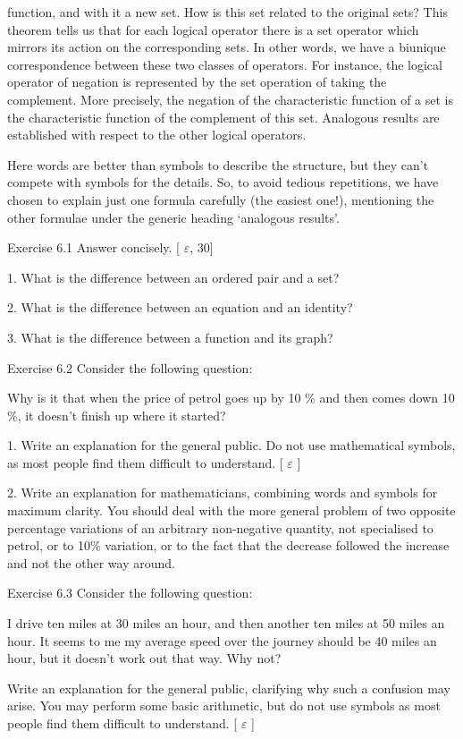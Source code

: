 \documentclass[11pt]{article}
\theoremstyle{plain}
\theoremstyle{definition}
\begin{document}
function, and with it a new set. How is this set related to the original sets? This theorem tells us that for each logical operator there is a set operator which mirrors its action on the corresponding sets. In other words, we have a biunique correspondence between these two classes of operators. For instance, the logical operator of negation is represented by the set operation of taking the complement. More precisely, the negation of the characteristic function of a set is the characteristic function of the complement of this set. Analogous results are established with respect to the other logical operators.

Here words are better than symbols to describe the structure, but they can't compete with symbols for the details. So, to avoid tedious repetitions, we have chosen to explain just one formula carefully (the easiest one!), mentioning the other formulae under the generic heading `analogous results'.

Exercise 6.1 Answer concisely. [ $\varepsilon$, 30]

1. What is the difference between an ordered pair and a set?

2. What is the difference between an equation and an identity?

3. What is the difference between a function and its graph?

Exercise 6.2 Consider the following question:

Why is it that when the price of petrol goes up by 10 \% and then comes down 10 \%, it doesn't finish up where it started?

1. Write an explanation for the general public. Do not use mathematical symbols, as most people find them difficult to understand. [ $\varepsilon$ ]

2. Write an explanation for mathematicians, combining words and symbols for maximum clarity. You should deal with the more general problem of two opposite percentage variations of an arbitrary non-negative quantity, not specialised to petrol, or to 10\% variation, or to the fact that the decrease followed the increase and not the other way around.

Exercise 6.3 Consider the following question:

I drive ten miles at 30 miles an hour, and then another ten miles at 50 miles an hour. It seems to me my average speed over the journey should be 40 miles an hour, but it doesn't work out that way. Why not?

Write an explanation for the general public, clarifying why such a confusion may arise. You may perform some basic arithmetic, but do not use symbols as most people find them difficult to understand. [ $\varepsilon$ ]
\end{document}
